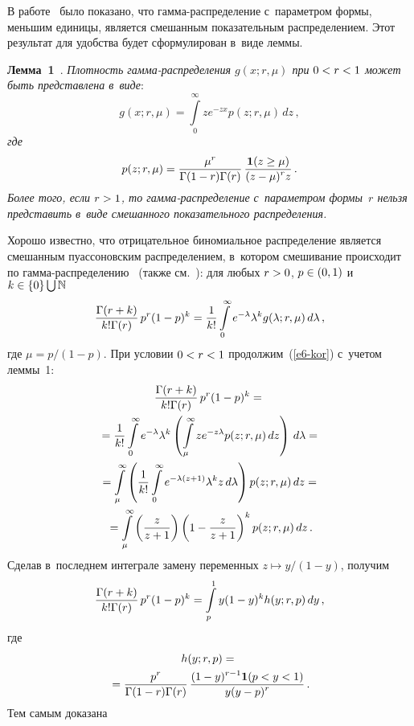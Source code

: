\begin{multicols}{2}
В работе~\cite{Gleser1989} было показано, что гам\-ма-рас\-пре\-де\-ле\-ние 
с~параметром формы, меньшим единицы, является смешанным показательным
распределением. Этот результат для удобства будет сформулирован в~виде леммы.

\smallskip

\noindent
\textbf{Лемма~1}~\cite{Gleser1989}. \textit{Плотность гам\-ма-рас\-пре\-де\-ле\-ния
$g(x;r,\mu)$ при $0\hm<r\hm<1$ может быть представлена в~виде}:
$$
g(x;r,\mu)=\int\limits_{0}^{\infty}ze^{-zx}p(z;r,\mu)\,dz\,,
$$
\textit{где}
\begin{equation}
p(z;r,\mu)=\displaystyle\frac{\displaystyle \mu^r\mathstrut}{\displaystyle \Gamma(1-r)\Gamma(r)\mathstrut}\,
\displaystyle\frac{\displaystyle \mathbf{1}(z\ge\mu)\mathstrut}{\displaystyle (z-\mu)^rz\mathstrut}\,.\label{e5-kor}
\end{equation}
\textit{Более того, если $r\hm>1$, то гам\-ма-рас\-пре\-де\-ле\-ние с~параметром 
формы~$r$ нельзя представить в~виде смешанного показательного
распределения.}

\smallskip

Хорошо известно, что отрицательное биномиальное распределение %
является смешанным пуассоновским распределением, в~котором
смешивание происходит по гам\-ма-рас\-пре\-де\-ле\-нию~\cite{GreenwoodYule1920} 
(также см.~\cite{KorolevBeningShorgin2011}): для любых $r\hm>0$, $p\hm\in(0,1)$ 
и~$k\hm\in\{0\}\bigcup\mathbb{N}$
\begin{equation}
\displaystyle\frac{\displaystyle \Gamma(r+k)\mathstrut}{\displaystyle k!\Gamma(r)\mathstrut}\,
p^r(1-p)^k=\displaystyle\frac{\displaystyle 1\mathstrut}{\displaystyle k!\mathstrut}\int\limits_{0}^{\infty}e^{-\lambda}\lambda^kg(\lambda;r,\mu)\,
d\lambda\,,\label{e6-kor}
\end{equation}
где $\mu=p/(1-p)$. При условии $0\hm<r\hm<1$ продолжим~(\ref{e6-kor}) с~учетом леммы~1:
\begin{multline*}
\displaystyle\frac{\displaystyle \Gamma(r+k)\mathstrut}{\displaystyle k!\Gamma(r)\mathstrut}\,
p^r(1-p)^k={}\\
{}=\displaystyle\frac{\displaystyle 1\mathstrut}{\displaystyle k!\mathstrut}\int\limits_{0}^{\infty}
e^{-\lambda}\lambda^k\left(\int\limits_{\mu}^{\infty}ze^{-z\lambda}p(z;r,\mu)\,dz\right)\,d\lambda={}
\\
{}=\int\limits_{\mu}^{\infty}\left(\displaystyle\frac{\displaystyle 1\mathstrut}{\displaystyle k!\mathstrut}\int\limits_{0}^{\infty}
e^{-\lambda(z+1)}\lambda^kz\,d\lambda\right)p(z;r,\mu)\,dz={}\\
{}=
\int\limits_{\mu}^{\infty}\left(\displaystyle\frac{\displaystyle z\mathstrut}{\displaystyle z+1\mathstrut}\right)
\left(1-\displaystyle\frac{\displaystyle z\mathstrut}{\displaystyle z+1\mathstrut}\right)^kp(z;r,\mu)\,dz\,.
\end{multline*}
Сделав в~последнем интеграле замену переменных $z\longmapsto
y/(1-y)$, получим
$$
\displaystyle\frac{\displaystyle \Gamma(r+k)\mathstrut}{\displaystyle k!\Gamma(r)\mathstrut}\,
p^r(1-p)^k=\int\limits_{p}^{1}y(1-y)^kh(y;r,p)\,dy\,,
$$
где
\begin{multline}
h(y;r,p)={}\\
{}=\displaystyle\frac{\displaystyle p^r\mathstrut}{\displaystyle \Gamma(1-r)\Gamma(r)\mathstrut}\,
\displaystyle\frac{\displaystyle (1-y)^{r-1}\mathbf{1}(p<y<1)\mathstrut}{\displaystyle y(y-p)^r\mathstrut}\,.
\label{e7-kor}
\end{multline}
Тем самым доказана


\end{multicols}
